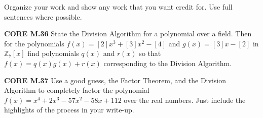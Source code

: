 \documentclass[addpoints]{exam}
\begin{document}
Organize your work and show any work that you want credit for. Use full sentences where possible.

\begin{questions}

\question \textbf{CORE M.36}
State the Division Algorithm for a polynomial over a field. Then for the polynomials $f(x)=[2]x^3+[3]x^2-[4]$ and $g(x)=[3]x-[2]$ in $\mathbb{Z}_7[x]$ find polynomials $q(x)$ and $r(x)$ so that $f(x)=q(x)g(x)+r(x)$ corresponding to the Division Algorithm.


\question \textbf{CORE M.37}
Use a good guess, the Factor Theorem, and the Division Algorithm to completely factor the polynomial $f(x)=x^4+2x^3-57x^2-58x+112$ over the real numbers. Just include the highlights of the process in your write-up.


\end{questions}
\end{document}
